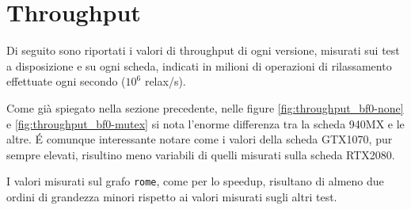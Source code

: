 \documentclass[12pt,a4paper,oneside]{book}
\begin{document}
	\section{Throughput}
	Di seguito sono riportati i valori di throughput di ogni versione, misurati sui test a disposizione e su ogni scheda, indicati in milioni di operazioni di rilassamento effettuate ogni secondo ($10^6$ relax/s).
	
	Come già spiegato nella sezione precedente, nelle figure \ref{fig:throughput_bf0-none} e \ref{fig:throughput_bf0-mutex} si nota l'enorme differenza tra la scheda 940MX e le altre. \'E comunque interessante notare come i valori della scheda GTX1070, pur sempre elevati, risultino meno variabili di quelli misurati sulla scheda RTX2080.
	
	I valori misurati sul grafo \texttt{rome}, come per lo speedup, risultano di almeno due ordini di grandezza minori rispetto ai valori misurati sugli altri test.
	
\end{document}

